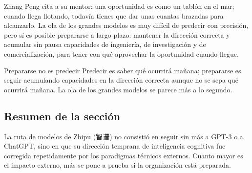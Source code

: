 Zhang Peng cita a su mentor: una oportunidad es como un tablón en el mar; cuando llega flotando, todavía tienes que dar unas cuantas brazadas para alcanzarlo. La ola de los grandes modelos es muy difícil de predecir con precisión, pero sí es posible prepararse a largo plazo: mantener la dirección correcta y acumular sin pausa capacidades de ingeniería, de investigación y de comercialización, para tener con qué aprovechar la oportunidad cuando llegue.

\begin{importantbox}{Prepararse no es predecir}
Predecir es saber qué ocurrirá mañana; prepararse es seguir acumulando capacidades en la dirección correcta aunque no se sepa qué ocurrirá mañana. La ola de los grandes modelos se parece más a lo segundo.
\end{importantbox}

\subsection{Resumen de la sección}

La ruta de modelos de Zhipu (智谱) no consistió en seguir sin más a GPT-3 o a ChatGPT, sino en que su dirección temprana de inteligencia cognitiva fue corregida repetidamente por los paradigmas técnicos externos. Cuanto mayor es el impacto externo, más se pone a prueba si la organización está preparada.
